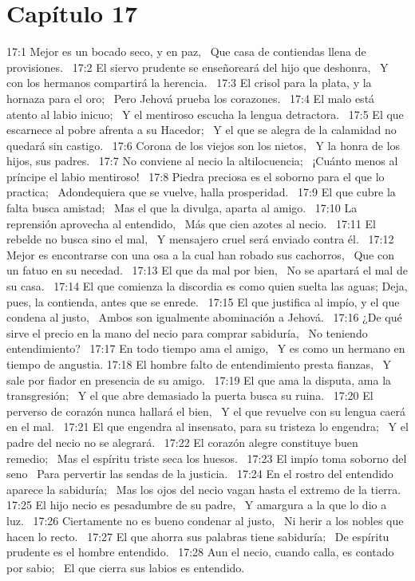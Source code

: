 \section*{Capítulo 17 }

17:1 Mejor es un bocado seco, y en paz,  
Que casa de contiendas llena de provisiones.  
17:2 El siervo prudente se enseñoreará del hijo que deshonra,  
Y con los hermanos compartirá la herencia.  
17:3 El crisol para la plata, y la hornaza para el oro;  
Pero Jehová prueba los corazones.  
17:4 El malo está atento al labio inicuo;  
Y el mentiroso escucha la lengua detractora.  
17:5 El que escarnece al pobre afrenta a su Hacedor;  
Y el que se alegra de la calamidad no quedará sin castigo.  
17:6 Corona de los viejos son los nietos,  
Y la honra de los hijos, sus padres.  
17:7 No conviene al necio la altilocuencia;  
¡Cuánto menos al príncipe el labio mentiroso!  
17:8 Piedra preciosa es el soborno para el que lo practica;  
Adondequiera que se vuelve, halla prosperidad.  
17:9 El que cubre la falta busca amistad;  
Mas el que la divulga, aparta al amigo.  
17:10 La reprensión aprovecha al entendido,  
Más que cien azotes al necio.  
17:11 El rebelde no busca sino el mal,  
Y mensajero cruel será enviado contra él.  
17:12 Mejor es encontrarse con una osa a la cual han robado sus cachorros,  
Que con un fatuo en su necedad.  
17:13 El que da mal por bien,  
No se apartará el mal de su casa.  
17:14 El que comienza la discordia es como quien suelta las aguas; 
Deja, pues, la contienda, antes que se enrede.  
17:15 El que justifica al impío, y el que condena al justo,  
Ambos son igualmente abominación a Jehová.  
17:16 ¿De qué sirve el precio en la mano del necio para comprar sabiduría,  
No teniendo entendimiento?  
17:17 En todo tiempo ama el amigo,  
Y es como un hermano en tiempo de angustia. 
17:18 El hombre falto de entendimiento presta fianzas,  
Y sale por fiador en presencia de su amigo.  
17:19 El que ama la disputa, ama la transgresión;  
Y el que abre demasiado la puerta busca su ruina.  
17:20 El perverso de corazón nunca hallará el bien,  
Y el que revuelve con su lengua caerá en el mal.  
17:21 El que engendra al insensato, para su tristeza lo engendra;  
Y el padre del necio no se alegrará.  
17:22 El corazón alegre constituye buen remedio;  
Mas el espíritu triste seca los huesos.  
17:23 El impío toma soborno del seno  
Para pervertir las sendas de la justicia.  
17:24 En el rostro del entendido aparece la sabiduría;  
Mas los ojos del necio vagan hasta el extremo de la tierra.  
17:25 El hijo necio es pesadumbre de su padre,  
Y amargura a la que lo dio a luz.  
17:26 Ciertamente no es bueno condenar al justo,  
Ni herir a los nobles que hacen lo recto.  
17:27 El que ahorra sus palabras tiene sabiduría;  
De espíritu prudente es el hombre entendido.  
17:28 Aun el necio, cuando calla, es contado por sabio;  
El que cierra sus labios es entendido. 
